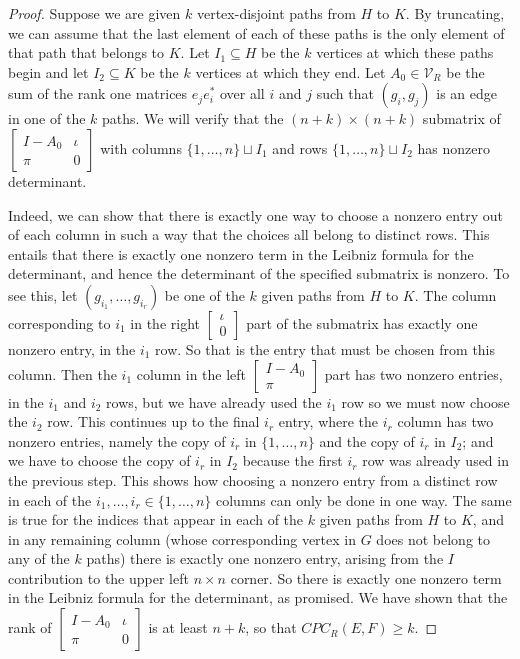 \documentclass{amsart}
\theoremstyle{definition}
\begin{document}
\begin{proof}
Suppose we are given $k$ vertex-disjoint paths from $H$ to $K$. By truncating, we can assume that the last element of each of these paths is the only element of that path that belongs to $K$. Let $I_1 \subseteq H$ be the $k$ vertices at which these paths begin and let $I_2 \subseteq K$ be the $k$ vertices at which they end. Let $A_0 \in \mathcal{V}_R$ be the sum of the rank one matrices $e_je_i^*$ over all $i$ and $j$ such that $(g_i, g_j)$ is an edge in one of the $k$ paths. We will verify that the $(n+k)\times(n+k)$ submatrix of $\left[\begin{matrix}I - A_0& \iota\\ \pi&0\end{matrix}\right]$ with columns $\{1, \ldots, n\} \sqcup I_1$ and rows $\{1, \ldots, n\} \sqcup I_2$ has nonzero determinant.

Indeed, we can show that there is exactly one way to choose a nonzero entry out of each column in such a way that the choices all belong to distinct rows. This entails that there is exactly one nonzero term in the Leibniz formula for the determinant, and hence the determinant of the specified submatrix is nonzero. To see this, let $(g_{i_1}, 
\ldots, g_{i_r})$ be one of the $k$ given paths from $H$ to $K$. The column corresponding to $i_1$ in the right $\left[\begin{matrix}\iota \\ 0\end{matrix}\right]$ part of the submatrix has exactly one nonzero entry, in the $i_1$ row. So that is the entry that must be chosen from this column. Then the $i_1$ column in the left $\left[\begin{matrix} I - A_0 \\ \pi\end{matrix}\right]$ part has two nonzero entries, in the $i_1$ and $i_2$ rows, but we have already used the $i_1$ row so we must now choose the $i_2$ row. This continues up to the final $i_r$ entry, where the $i_r$ column has two nonzero entries, namely the copy of $i_r$ in $\{1, \ldots, n\}$ and the copy of $i_r$ in $I_2$; and we have to choose the copy of $i_r$ in $I_2$ because the first $i_r$ row was already used in the previous step. This shows how choosing a nonzero entry from a distinct row in each of the $i_1, \ldots, i_r \in \{1, \ldots, n\}$ columns can only be done in one way. The same is true for the indices that appear in each of the $k$ given paths from $H$ to $K$, and in any remaining column (whose corresponding vertex in $G$ does not belong to any of the $k$ paths) there is exactly one nonzero entry, arising from the $I$ contribution to the upper left $n\times n$ corner. So there is exactly one nonzero term in the Leibniz formula for the determinant, as promised. We have shown that the rank of $\left[\begin{matrix}I - A_0& \iota\\ \pi&0\end{matrix}\right]$ is at least $n + k$, so that $CPC_R(E, F) \geq k$.


\end{proof}
\end{document}
